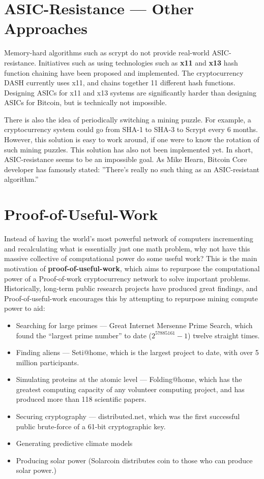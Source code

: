 \documentclass[11pt]{article}
\begin{document}
    \section*{ASIC-Resistance --- Other Approaches}
    
    Memory-hard algorithms such as scrypt do not provide real-world ASIC-resistance. Initiatives such as using technologies such as \textbf{x11} and \textbf{x13} hash function chaining have been proposed and implemented. The cryptocurrency DASH currently uses x11, and chains together 11 different hash functions. Designing ASICs for x11 and x13 systems are significantly harder than designing ASICs for Bitcoin, but is technically not impossible.
    
    There is also the idea of periodically switching a mining puzzle. For example, a cryptocurrency system could go from SHA-1 to SHA-3 to Scrypt every 6 months. However, this solution is easy to work around, if one were to know the rotation of such mining puzzles. This solution has also not been implemented yet. In short, ASIC-resistance seems to be an impossible goal. As Mike Hearn, Bitcoin Core developer has famously stated: ''There's really no such thing as an ASIC-resistant algorithm.''
    
    \section*{Proof-of-Useful-Work}
    
    Instead of having the world's most powerful network of computers incrementing and recalculating what is essentially just one math problem, why not have this massive collective of computational power do some useful work? This is the main motivation of \textbf{proof-of-useful-work}, which aims to repurpose the computational power of a Proof-of-work cryptocurrency network to solve important problems. Historically, long-term public research projects have produced great findings, and Proof-of-useful-work encourages this by attempting to repurpose mining compute power to aid:
    
    \begin{itemize}
        \item Searching for large primes --- Great Internet Mersenne Prime Search, which found the ``largest prime number'' to date ($2^{57885161} - 1$) twelve straight times.
        \item Finding aliens --- Seti@home, which is the largest project to date, with over 5 million participants.
        \item Simulating proteins at the atomic level --- Folding@home, which has the greatest computing capacity of any volunteer computing project, and has produced more than 118 scientific papers. 
        \item Securing cryptography --- distributed.net, which was the first successful public brute-force of a 61-bit cryptographic key.
        \item Generating predictive climate models 
        \item Producing solar power (Solarcoin distributes coin to those who can produce solar power.)
    \end{itemize}
    
\end{document}
